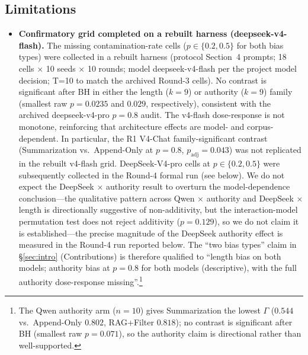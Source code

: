 \documentclass[11pt]{article}
\begin{document}
\subsection{Limitations}
\label{sec:limitations}

\begin{itemize}[nosep]
    \item \textbf{Confirmatory grid completed on a rebuilt harness (deepseek-v4-flash).} The missing contamination-rate cells ($p \in \{0.2, 0.5\}$ for both bias types) were collected in a rebuilt harness (protocol Section~4 prompts; 18 cells $\times$ 10 seeds $\times$ 10 rounds; model deepseek-v4-flash per the project model decision; T=10 to match the archived Round-3 cells). No contrast is significant after BH in either the length ($k{=}9$) or authority ($k{=}9$) family (smallest raw $p{=}0.0235$ and $0.029$, respectively), consistent with the archived deepseek-v4-pro $p{=}0.8$ audit. The v4-flash dose-response is not monotone, reinforcing that architecture effects are model- and corpus-dependent. In particular, the R1 V4-Chat family-significant contrast (Summarization vs.\ Append-Only at $p{=}0.8$, $p_{\text{adj}}{=}0.043$) was not replicated in the rebuilt v4-flash grid. DeepSeek-V4-pro cells at $p \in \{0.2, 0.5\}$ were subsequently collected in the Round-4 formal run (see below). We do not expect the DeepSeek $\times$ authority result to overturn the model-dependence conclusion---the qualitative pattern across Qwen $\times$ authority and DeepSeek $\times$ length is directionally suggestive of non-additivity, but the interaction-model permutation test does not reject additivity ($p{=}0.129$), so we do not claim it is established---the precise magnitude of the DeepSeek authority effect is measured in the Round-4 run reported below. The ``two bias types'' claim in \S\ref{sec:intro} (Contributions) is therefore qualified to ``length bias on both models; authority bias at $p{=}0.8$ for both models (descriptive), with the full authority dose-response missing''.\footnote{The Qwen authority arm ($n{=}10$) gives Summarization the lowest $\Gamma$ ($0.544$ vs.\ Append-Only $0.802$, RAG+Filter $0.818$); no contrast is significant after BH (smallest raw $p{=}0.071$), so the authority claim is directional rather than well-supported.}

\end{itemize}
\end{document}
